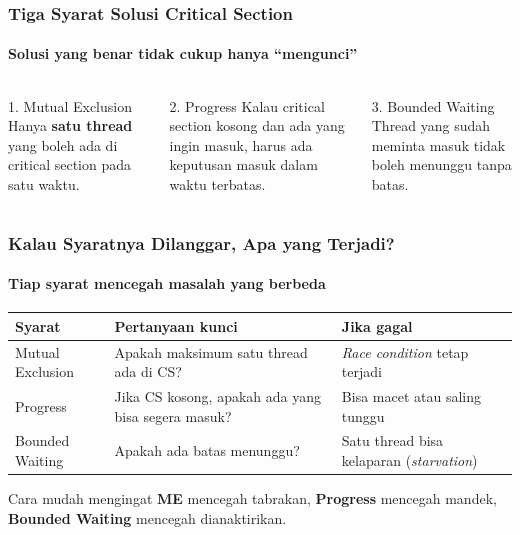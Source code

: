\documentclass[t,aspectratio=169,xcolor=dvipsnames]{beamer}
\begin{document}
\begin{frame}
    \frametitle{Tiga Syarat Solusi Critical Section}
    \framesubtitle{Solusi yang benar tidak cukup hanya ``mengunci''}
    \small

    \begin{columns}[T]
        \begin{block}{1. Mutual Exclusion}
            Hanya \textbf{satu thread} yang boleh ada di critical section pada satu waktu.
        \end{block}

        \begin{exampleblock}{2. Progress}
            Kalau critical section kosong dan ada yang ingin masuk, harus ada keputusan masuk dalam waktu terbatas.
        \end{exampleblock}

        \begin{alertblock}{3. Bounded Waiting}
            Thread yang sudah meminta masuk tidak boleh menunggu tanpa batas.
        \end{alertblock}
    \end{columns}
\end{frame}

\begin{frame}
    \frametitle{Kalau Syaratnya Dilanggar, Apa yang Terjadi?}
    \framesubtitle{Tiap syarat mencegah masalah yang berbeda}
    \scriptsize

    \begin{tabular}{p{}p{}p{}}
        \toprule
        \textbf{Syarat} & \textbf{Pertanyaan kunci} & \textbf{Jika gagal} \\
        \midrule
        Mutual Exclusion & Apakah maksimum satu thread ada di CS? & \textit{Race condition} tetap terjadi \\
        Progress & Jika CS kosong, apakah ada yang bisa segera masuk? & Bisa macet atau saling tunggu \\
        Bounded Waiting & Apakah ada batas menunggu? & Satu thread bisa kelaparan (\textit{starvation}) \\
        \bottomrule
    \end{tabular}

    \vspace{0.25cm}
    \begin{block}{Cara mudah mengingat}
        \textbf{ME} mencegah tabrakan, \textbf{Progress} mencegah mandek, \textbf{Bounded Waiting} mencegah dianaktirikan.
    \end{block}
\end{frame}
\end{document}
